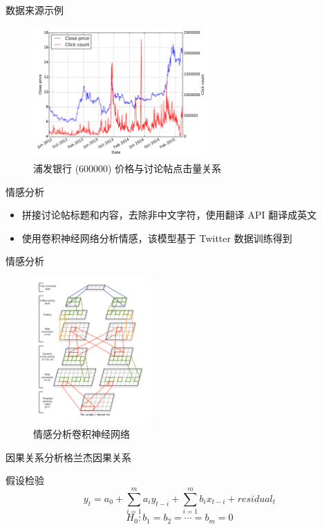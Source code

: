 \documentclass{beamer}
\begin{document}
\begin{frame}{数据来源}{示例}
\begin{figure}
  \includegraphics[width=0.6\textwidth]{plots/price_and_click_count.pdf}
  \caption{浦发银行 (600000) 价格与讨论帖点击量关系}
\end{figure}
\end{frame}

\begin{frame}{情感分析}
\begin{itemize}
  \item 拼接讨论帖标题和内容，去除非中文字符，使用翻译 API 翻译成英文
  \pause
  \item 使用卷积神经网络分析情感，该模型基于 Twitter 数据训练得到
\end{itemize}
\end{frame}

\begin{frame}{情感分析}
\begin{figure}
  \includegraphics[width=0.4\textwidth]{plots/0.png}
  \caption{情感分析卷积神经网络}
\end{figure}
\end{frame}

\begin{frame}{因果关系分析}{格兰杰因果关系}
\begin{block}{假设检验}
  \[
    y_{t}=a_{0}+\sum_{i=1}^{m}a_{i}y_{t-i}+\sum_{i=1}^{m}b_{i}x_{t-i}+residual_{t}
  \]
  \[
    H_{0}:b_{1}=b_{2}=\cdots =b_{m}=0
  \]
\end{block}
\end{frame}
\end{document}
